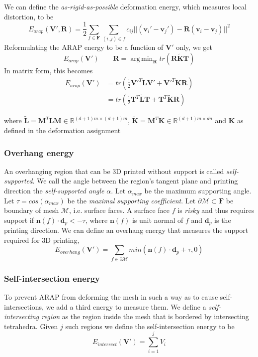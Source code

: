 \documentclass[10pt]{article}
\newcommand{\R}{\mathbb{R}}
\newcommand{\calM}{\mathcal{M}}
\newcommand{\bL}{\mathbf{L}}
\newcommand{\bV}{\mathbf{V}}
\newcommand{\bF}{\mathbf{F}}
\newcommand{\bR}{\mathbf{R}}
\newcommand{\bM}{\mathbf{M}}
\newcommand{\bT}{\mathbf{T}}
\newcommand{\bv}{\mathbf{v}}
\newcommand{\bK}{\mathbf{K}}
\newcommand{\bn}{\mathbf{n}}
\newcommand{\bd}{\mathbf{d}}
\DeclareMathOperator*{\argmin}{arg\,min} %
\begin{document}
\begin{multicols}{2}
We can define the \textit{as-rigid-as-possible} deformation energy, which measures local distortion, to be
\[
    E_{arap}(\bV', \bR) = \frac{1}{2} \sum_{f\in \bF} \sum_{(i,j)\in f} c_{ij} || (\bv_i' - \bv_j') - \bR(\bv_i - \bv_j) ||^2
\]
Reformulating the ARAP energy to be a function of $\bV'$ only, we get
\[
    E_{arap}(\bV')
    \qquad
    \bR = \argmin_{\bR} tr(\bR\tilde{\bK}\bT)
\]
In matrix form, this becomes
\begin{align*}
E_{arap}(\bV') 
    &= tr(\frac{1}{2}\bV'^T \bL \bV' + \bV'^T \bK \bR ) \\
    &= tr(\frac{1}{2}\bT^T \tilde{\bL} \bT + \bT^T \tilde{\bK} \bR)
\end{align*}
    
where $\tilde{\bL} = \bM^T \bL \bM \in \R^{(d+1)m \times (d+1)m}$, $\tilde{\bK} = \bM^T \bK \in \R^{(d+1)m \times dn}$ and $\bK$ as defined in the deformation assignment

\subsubsection*{Overhang energy}

An overhanging region that can be 3D printed without support is called \textit{self-supported}. We call the angle between the region's tangent plane and printing direction the \textit{self-supported angle} $\alpha$. Let $\alpha_{max}$ be the maximum supporting angle. Let $\tau = cos(\alpha_{max})$ be the \textit{maximal supporting coefficient}. Let $\partial \calM \subset \bF$ be boundary of mesh $\calM$, i.e. surface faces. A surface face $f$ is \textit{risky} and thus requires support if $\bn(f) \cdot \bd_{p} < -\tau$, where $\bn(f)$ is unit normal of $f$ and $\bd_{p}$ is the printing direction. We can define an overhang energy that measures the support required for 3D printing,
\[
    E_{overhang}(\bV') = \sum_{f\in \partial \calM} min(\bn(f) \cdot \bd_{p} + \tau, 0)
\]


\subsubsection*{Self-intersection energy}

To prevent ARAP from deforming the mesh in such a way as to cause self-intersections, we add a third energy to measure them. We define a \textit{self-intersecting region} as the region inside the mesh that is bordered by intersecting tetrahedra. Given $j$ such regions we define the self-intersection energy to be
\[
	E_{intersect}(\bV') = \sum_{i=1}^j V_i
\]


\end{multicols}
\end{document}
